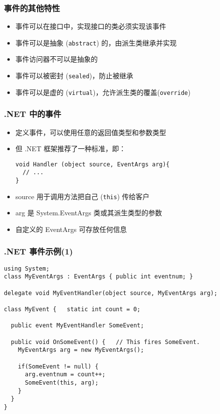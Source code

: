 \begin{frame}[fragile]
\frametitle{事件的其他特性}
\setlength{\itemsep}{6pt plus 1pt}
\begin{itemize}
\item 事件可以在接口中，实现接口的类必须实现该事件
\item 事件可以是抽象 (\texttt{abstract}) 的，由派生类继承并实现
\item 事件访问器不可以是抽象的
\item 事件可以被密封 (\texttt{sealed})，防止被继承
\item 事件可以是虚的 (\texttt{virtual})，允许派生类的覆盖(\texttt{override})
\end{itemize}
\end{frame}

\begin{frame}[fragile]
\frametitle{.NET 中的事件}
\begin{itemize}
\item 定义事件，可以使用任意的返回值类型和参数类型
\item 但 .NET 框架推荐了一种标准，即：
\begin{lstlisting}
void Handler (object source, EventArgs arg){
  // ...
}
\end{lstlisting}
\end{itemize}
\medskip
\begin{itemize}
\item source 用于调用方法把自己 (\texttt{this}) 传给客户
\item arg 是 System.EventArgs 类或其派生类型的参数
\item 自定义的 EventArgs 可存放任何信息
\end{itemize}

\end{frame}

\begin{frame}[fragile]
\frametitle{.NET 事件示例(1)}
\begin{lstlisting}
using System;
class MyEventArgs : EventArgs { public int eventnum; }

delegate void MyEventHandler(object source, MyEventArgs arg);

class MyEvent {   static int count = 0;

  public event MyEventHandler SomeEvent;

  public void OnSomeEvent() {   // This fires SomeEvent.
    MyEventArgs arg = new MyEventArgs();

    if(SomeEvent != null) {
      arg.eventnum = count++;
      SomeEvent(this, arg);
    }
  }
}
\end{lstlisting}
\end{frame}

